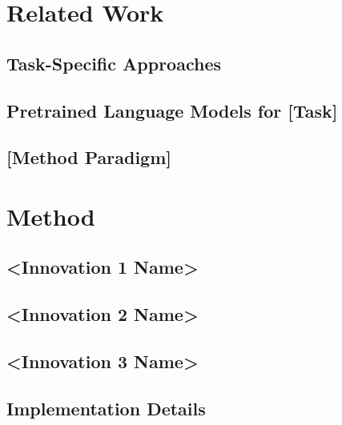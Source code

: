 \documentclass[11pt,a4paper]{article}
\begin{document}
\section{Related Work}

\subsection{Task-Specific Approaches}
\subsection{Pretrained Language Models for [Task]}
\subsection{[Method Paradigm]}

\section{Method}
\label{sec:method}


\subsection{<Innovation 1 Name>}
\label{sec:method-innov1}


\subsection{<Innovation 2 Name>}
\label{sec:method-innov2}


\subsection{<Innovation 3 Name>}
\label{sec:method-innov3}


\subsection{Implementation Details}
\label{sec:method-impl}
\end{document}
